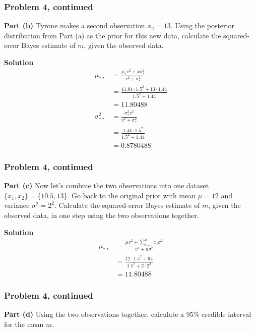 \documentclass[12pt]{article}
\theoremstyle{definition}
\begin{document}
\newpage
\subsubsection*{Problem 4, continued}

\noindent
{\bf Part (b)} Tyrone makes a second observation $x_2 = 13$. Using the posterior distribution from Part (a) as the prior for this new data, calculate the squared-error Bayes estimate of $m$, given the observed data.

\bigskip
\noindent
{\bf Solution} 
\begin{align*}
\mu_{**} &= \frac{\mu_* v^2 + x\sigma^2_*}{v^2 + \sigma^2_*}\\
&= \frac{11.04 \cdot 1.5^2 + 13 \cdot 1.44}{1.5^2 + 1.44}\\
&= 11.80488\\
\sigma^2_{**} &= \frac{\sigma^2_* v^2}{v^2 + \sigma^2_*}\\
&= \frac{1.44 \cdot 1.5^2}{1.5^2 + 1.44}\\
&= 0.8780488
\end{align*}



\newpage
\subsubsection*{Problem 4, continued}

\noindent
{\bf Part (c)} Now let's combine the two observations into one dataset $\{x_1, x_2\} = \{10.5, 13\}$. Go back to the original prior with mean $\mu = 12$ and variance $\sigma^2 = 2^2$. Calculate the squared-error Bayes estimate of $m$, given the observed data, in one step using the two observations together.

\bigskip
\noindent
{\bf Solution} 
\begin{align*}
\mu_{**} &= \frac{\mu v^2 + \sum_{i=1}^n x_i \sigma^2}{v^2 + n\sigma^2}\\
&= \frac{12 \cdot 1.5^2 + 94}{1.5^2 + 2 \cdot 2^2}\\
&= 11.80488
\end{align*}

\newpage
\subsubsection*{Problem 4, continued}

\noindent
{\bf Part (d)} Using the two observations together, calculate a 95\% credible interval for the mean $m$.
\end{document}
